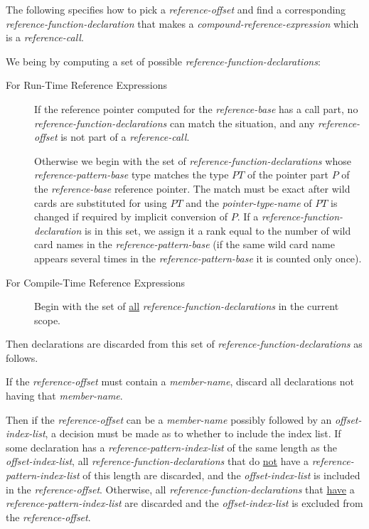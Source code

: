 \documentclass[12pt]{article}
\begin{document}
The following specifies how to pick a {\em reference-offset} 
and find a corresponding {\em reference-function-declaration}
that makes a {\em compound-reference-expression} which is a
{\em reference-call}.

We being by computing a set of possible {\em reference-function-declarations}:

\begin{description}

\item[For Run-Time Reference Expressions]
If the reference pointer computed for the {\em refer\-ence-base}
has a call part, no {\em reference-function-declarations} can match
the situation, and any {\em reference-offset} is not
part of a {\em reference-call}.

Otherwise we begin with the set of {\em reference-function-declarations}
whose {\em reference-pattern-base} type matches the
type $PT$ of the pointer part $P$ of the {\em reference-base} reference pointer.
The match must be exact after wild cards are substituted for using
$PT$ and the {\em pointer-type-name} of $PT$ is changed if required by
implicit conversion of $P$.  If a {\em reference-function-declaration}
is in this set, we assign it a rank equal to the number of wild card names
in the {\em reference-pattern-base}
(if the same wild card name appears several times in the
{\em reference-pattern-base} it is counted only once).

\item[For Compile-Time Reference Expressions]
Begin with the set of \underline{all}
{\em reference-function-declarations} in the
current scope.

\end{description}

Then declarations are discarded from this set of
{\em reference-function-declarations} as follows.

If the {\em reference-offset} must contain a {\em member-name},
discard all declarations not having that {\em member-name}.

Then if the
{\em reference-offset} can be a {\em member-name} possibly followed by an
{\em offset-index-list}, a decision must be made as to whether to
include the index list.  If some declaration has a
{\em reference-pattern-index-list} of the same length as
the {\em offset-index-list},
all {\em reference-function-declarations}
that do \underline{not} have a
{\em reference-pattern-index-list} of this length are discarded,
and the {\em offset-index-list} is included in the {\em reference-offset}.
Otherwise, all {\em reference-function-declarations} that \underline{have}
a {\em reference-pattern-index-list} are discarded and the
{\em offset-index-list} is excluded from the {\em reference-offset}.
\end{document}
